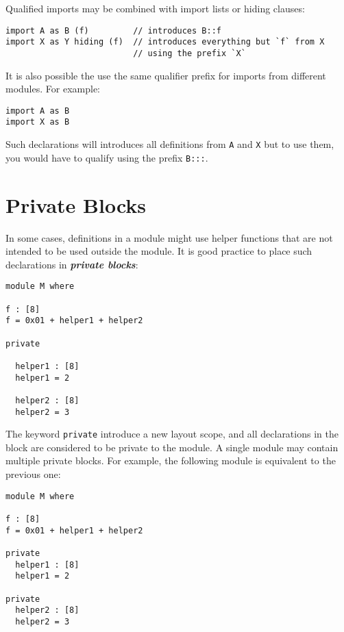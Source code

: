 Qualified imports may be combined with import lists or hiding clauses:

\begin{verbatim}
import A as B (f)         // introduces B::f
import X as Y hiding (f)  // introduces everything but `f` from X
                          // using the prefix `X`
\end{verbatim}

It is also possible the use the same qualifier prefix for imports from
different modules. For example:

\begin{verbatim}
import A as B
import X as B
\end{verbatim}

Such declarations will introduces all definitions from \texttt{A} and
\texttt{X} but to use them, you would have to qualify using the prefix
\texttt{B:::}.

\hypertarget{private-blocks}{%
\section{Private Blocks}\label{private-blocks}}

In some cases, definitions in a module might use helper functions that
are not intended to be used outside the module. It is good practice to
place such declarations in \textbf{\emph{private blocks}}:

\begin{verbatim}
module M where

f : [8]
f = 0x01 + helper1 + helper2

private

  helper1 : [8]
  helper1 = 2

  helper2 : [8]
  helper2 = 3
\end{verbatim}

The keyword \texttt{private} introduce a new layout scope, and all
declarations in the block are considered to be private to the module. A
single module may contain multiple private blocks. For example, the
following module is equivalent to the previous one:

\begin{verbatim}
module M where

f : [8]
f = 0x01 + helper1 + helper2

private
  helper1 : [8]
  helper1 = 2

private
  helper2 : [8]
  helper2 = 3
\end{verbatim}

